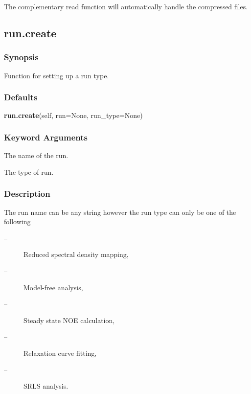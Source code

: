  The complementary read function will automatically handle the compressed files. 
  

  

 \newpage 

 \subsection{run.create} 

  
 \subsubsection{Synopsis} 

 Function for setting up a run type. 
  

  
 \subsubsection{Defaults} 

 \textsf{\textbf{run.create}(self, run=None, run\_type=None)} 

  
 \subsubsection{Keyword Arguments} 

   The name of the run.   

   The type of run.  

  

  
 \subsubsection{Description} 

 The run name can be any string however the run type can only be one of the following 
  

 \begin{description} 
 \item[ --]  Reduced spectral density mapping,  
 \item[ --]  Model-free analysis,  
 \item[ --]  Steady state NOE calculation,  
 \item[ --]  Relaxation curve fitting,  
 \item[ --]  SRLS analysis.  
 \end{description} 
  

